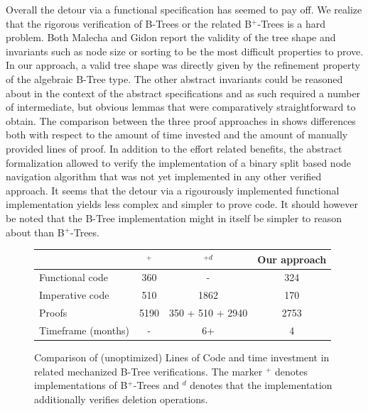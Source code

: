 Overall the detour via a functional specification has seemed to pay off.
We realize that the rigorous verification of B-Trees or the related B$^+$-Trees
is a hard problem.
Both Malecha and Gidon report the validity of the tree shape
and invariants such as node size or sorting
to be the most difficult properties to prove.
In our approach, a valid tree shape was directly given
by the refinement property of the algebraic B-Tree type.
The other abstract invariants could be reasoned about
in the context of the abstract specifications and as such
required a number of intermediate, but obvious
lemmas that were comparatively straightforward to obtain.
The comparison between the three proof approaches in \label{fig:proof-comparison}
shows differences both with respect to the amount of 
time invested and the amount of manually provided lines of proof.
In addition to the effort related benefits, the abstract formalization allowed to
verify the implementation of a binary split based node navigation
algorithm that was not yet implemented in any other verified approach.
It seems that the detour via a rigourously implemented
functional implementation yields less complex and
simpler to prove code.
It should however be noted that the B-Tree implementation
might in itself be simpler to reason about than B$^+$-Trees.

\begin{figure}
    \centering
    \begin{tabular}{l|c|c|c}
        \                & \parencite{DBLP:conf/popl/MalechaMSW10}$^{+}$ & \parencite{DBLP:journals/sosym/ErnstSR15}$^{+d}$ & Our approach \\
        \hline
        Functional code &   360      & -                    & 324  \\
        Imperative code &   510      & 1862                  & 170  \\
        Proofs          &  5190      & 350 + 510 + 2940\footnotemark[1] & 2753 \\
        Timeframe (months) &  -     & 6+                      & 4   \\
    \end{tabular}
    \caption[Comparison of (unoptimized) Lines of Code and time investment in related mechanized B-Tree verifications.]
    {Comparison of (unoptimized) Lines of Code and time investment in related mechanized B-Tree verifications.
    The marker $^+$ denotes implementations of B$^+$-Trees
    and $^d$ denotes that the implementation additionally verifies deletion operations.
    }
    \label{fig:proof-comparison}
\end{figure}

